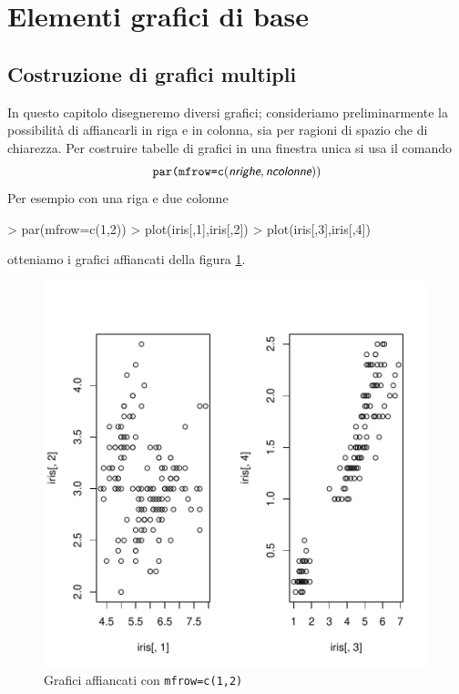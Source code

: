 \documentclass[onecolumn,11pt]{book}
\newcommand{\varia}[1]{\textsl{\textsf{#1}}}
\begin{document}
\section{Elementi grafici di base}
\subsection{Costruzione di grafici multipli}
In questo capitolo disegneremo diversi grafici;  consideriamo preliminarmente la possibilit\`a di affiancarli in riga e in colonna, sia per ragioni di spazio che di chiarezza.
Per costruire tabelle di grafici in una finestra unica si usa il comando
\begin{equation*}
\texttt{par(mfrow=c}(\varia{nrighe},\varia{ncolonne}))
\end{equation*}
Per esempio  con una riga e due colonne  
\begin{Schunk}
\begin{Sinput}
> par(mfrow=c(1,2))
> plot(iris[,1],iris[,2])
> plot(iris[,3],iris[,4])
\end{Sinput}
\end{Schunk}
otteniamo i grafici affiancati della figura \ref{graficiaffiancati}.
\begin{figure}
\begin{center}
\includegraphics{statisticaconR-337}
\caption{Grafici affiancati con \texttt{mfrow=c(1,2)}}
\label{graficiaffiancati}
\end{center}
\end{figure} 
\end{document}
